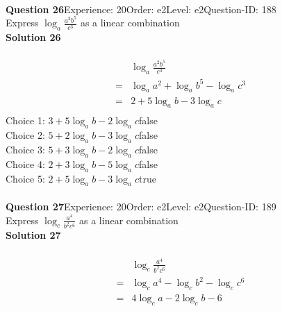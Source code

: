 \documentclass{article}
\begin{document}
\\[4pt]
\noindent\textbf{Question 26}\hspace{20pt}Experience: 20\hspace{20pt}Order: e2\hspace{20pt}Level: e2\hspace{20pt}Question-ID: 188\\[2pt]
Express $\log_{a}\displaystyle\frac{a^2b^5}{c^3}$ as a linear combination\\[4pt]
\noindent\textbf{Solution 26}\\[2pt]
\\[-35pt]\begin{align*}
&\log_{a}\displaystyle\frac{a^2b^5}{c^3}\\[2pt]
=&\log_{a}a^2+\log_{a}b^5-\log_{a}c^3\\[2pt]
=&2+5\log_{a}b-3\log_{a}c\\[-50pt]
\end{align*}
Choice 1: \hspace{20pt}$3+5\log_{a}b-2\log_{a}c$\hspace{20pt}false\\
Choice 2: \hspace{20pt}$5+2\log_{a}b-3\log_{a}c$\hspace{20pt}false\\
Choice 3: \hspace{20pt}$5+3\log_{a}b-2\log_{a}c$\hspace{20pt}false\\
Choice 4: \hspace{20pt}$2+3\log_{a}b-5\log_{a}c$\hspace{20pt}false\\
Choice 5: \hspace{20pt}$2+5\log_{a}b-3\log_{a}c$\hspace{20pt}true\\
\\[4pt]
\noindent\textbf{Question 27}\hspace{20pt}Experience: 20\hspace{20pt}Order: e2\hspace{20pt}Level: e2\hspace{20pt}Question-ID: 189\\[2pt]
Express $\log_{c}\displaystyle\frac{a^4}{b^2c^6}$ as a linear combination\\[4pt]
\noindent\textbf{Solution 27}\\[2pt]
\\[-35pt]\begin{align*}
&\log_{c}\displaystyle\frac{a^4}{b^2c^6}\\[2pt]
=&\log_{c}a^4-\log_{c}b^2-\log_{c}c^6\\[2pt]
=&4\log_{c}a-2\log_{c}b-6\\[-30pt]
\end{align*}
\end{document}
